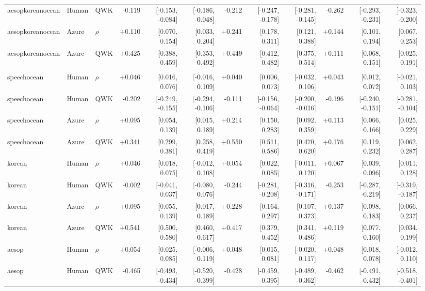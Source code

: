 \documentclass[10pt]{article}
\begin{document}
\begin{landscape}
\begin{longtable}{@{}lllrrrrrrrrr@{}}
aesopkoreanocean & Human & QWK & -0.119 & [-0.153, -0.084] & [-0.186, -0.048] & -0.212 & [-0.247, -0.178] & [-0.281, -0.145] & -0.262 & [-0.293, -0.231] & [-0.323, -0.200]\\
aesopkoreanocean & Azure & $\rho$ & +0.110 & [0.070, 0.154] & [0.033, 0.204] & +0.241 & [0.178, 0.311] & [0.121, 0.388] & +0.144 & [0.101, 0.194] & [0.067, 0.253]\\
aesopkoreanocean & Azure & QWK & +0.425 & [0.388, 0.459] & [0.353, 0.492] & +0.449 & [0.412, 0.482] & [0.375, 0.514] & +0.111 & [0.068, 0.151] & [0.025, 0.191]\\
\addlinespace[2pt]
\midrule\multicolumn{12}{l}{\textbf{1G-AMAE: 1-grid pronunciation-accuracy error}}\\*
speechocean & Human & $\rho$ & +0.046 & [0.016, 0.076] & [-0.016, 0.109] & +0.040 & [0.006, 0.073] & [-0.032, 0.106] & +0.043 & [0.012, 0.072] & [-0.021, 0.103]\\
speechocean & Human & QWK & -0.202 & [-0.249, -0.155] & [-0.294, -0.106] & -0.111 & [-0.156, -0.064] & [-0.200, -0.016] & -0.196 & [-0.240, -0.151] & [-0.281, -0.104]\\
speechocean & Azure & $\rho$ & +0.095 & [0.054, 0.139] & [0.015, 0.189] & +0.214 & [0.150, 0.283] & [0.092, 0.359] & +0.113 & [0.066, 0.166] & [0.025, 0.229]\\
speechocean & Azure & QWK & +0.341 & [0.299, 0.381] & [0.258, 0.419] & +0.550 & [0.511, 0.586] & [0.470, 0.620] & +0.176 & [0.119, 0.232] & [0.062, 0.287]\\
\addlinespace[2pt]
korean & Human & $\rho$ & +0.046 & [0.018, 0.075] & [-0.012, 0.108] & +0.054 & [0.022, 0.085] & [-0.011, 0.120] & +0.067 & [0.039, 0.096] & [0.011, 0.128]\\
korean & Human & QWK & -0.002 & [-0.041, 0.037] & [-0.080, 0.076] & -0.244 & [-0.281, -0.208] & [-0.316, -0.171] & -0.253 & [-0.287, -0.219] & [-0.319, -0.187]\\
korean & Azure & $\rho$ & +0.095 & [0.055, 0.139] & [0.017, 0.189] & +0.228 & [0.164, 0.297] & [0.107, 0.373] & +0.137 & [0.098, 0.183] & [0.066, 0.237]\\
korean & Azure & QWK & +0.541 & [0.500, 0.580] & [0.460, 0.617] & +0.417 & [0.379, 0.452] & [0.341, 0.486] & +0.119 & [0.077, 0.160] & [0.034, 0.199]\\
\addlinespace[2pt]
aesop & Human & $\rho$ & +0.054 & [0.025, 0.085] & [-0.006, 0.119] & +0.048 & [0.015, 0.081] & [-0.020, 0.117] & +0.048 & [0.018, 0.078] & [-0.012, 0.110]\\
aesop & Human & QWK & -0.465 & [-0.493, -0.434] & [-0.520, -0.399] & -0.428 & [-0.459, -0.395] & [-0.489, -0.362] & -0.462 & [-0.491, -0.432] & [-0.518, -0.401]\\

\end{longtable}
\end{landscape}
\end{document}

